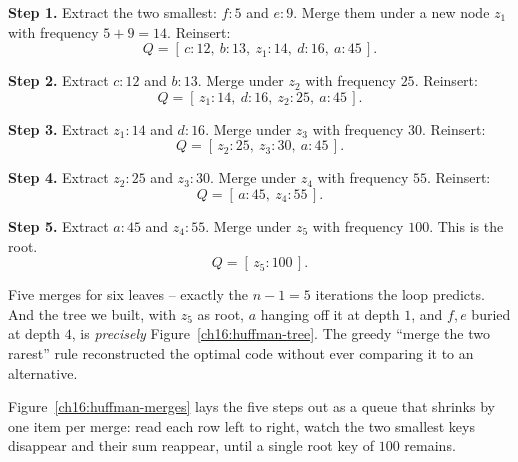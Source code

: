 \textbf{Step 1.} Extract the two smallest: $f{:}5$ and $e{:}9$. Merge them under a
new node $z_1$ with frequency $5+9 = 14$. Reinsert:
\[
  Q = [\,c{:}12,\ b{:}13,\ z_1{:}14,\ d{:}16,\ a{:}45\,].
\]

\textbf{Step 2.} Extract $c{:}12$ and $b{:}13$. Merge under $z_2$ with frequency
$25$. Reinsert:
\[
  Q = [\,z_1{:}14,\ d{:}16,\ z_2{:}25,\ a{:}45\,].
\]

\textbf{Step 3.} Extract $z_1{:}14$ and $d{:}16$. Merge under $z_3$ with frequency
$30$. Reinsert:
\[
  Q = [\,z_2{:}25,\ z_3{:}30,\ a{:}45\,].
\]

\textbf{Step 4.} Extract $z_2{:}25$ and $z_3{:}30$. Merge under $z_4$ with
frequency $55$. Reinsert:
\[
  Q = [\,a{:}45,\ z_4{:}55\,].
\]

\textbf{Step 5.} Extract $a{:}45$ and $z_4{:}55$. Merge under $z_5$ with frequency
$100$. This is the root.
\[
  Q = [\,z_5{:}100\,].
\]

Five merges for six leaves -- exactly the $n-1 = 5$ iterations the loop predicts.
And the tree we built, with $z_5$ as root, $a$ hanging off it at depth $1$,
and $f,e$ buried at depth $4$, is \emph{precisely}
Figure~\ref{ch16:huffman-tree}. The greedy ``merge the two rarest'' rule
reconstructed the optimal code without ever comparing it to an alternative.

Figure~\ref{ch16:huffman-merges} lays the five steps out as a queue that shrinks
by one item per merge: read each row left to right, watch the two smallest keys
disappear and their sum reappear, until a single root key of $100$ remains.


